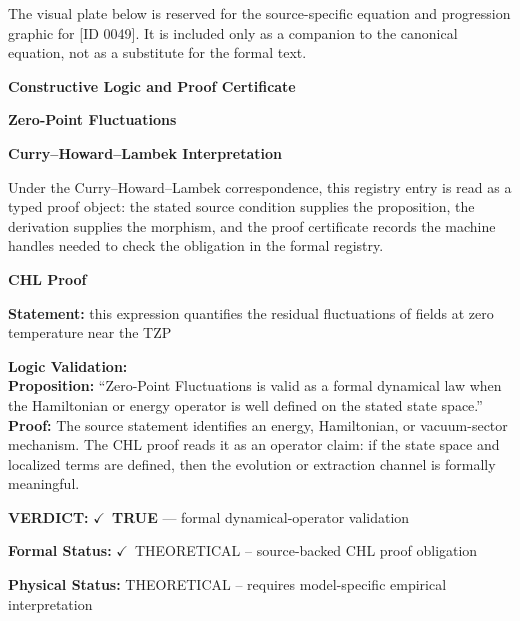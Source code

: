 \begingroup\footnotesize\sloppy
The visual plate below is reserved for the source-specific equation and progression graphic for [ID 0049]. It is included only as a companion to the canonical equation, not as a substitute for the formal text.
\par\endgroup
\ifTZPDarkEdition
{}
\fi

\clearpage
\begingroup\tzpsupportsetup
\noindent\textbf{\fontsize{10.8pt}{12.8pt}\selectfont [ID 0049] Constructive Logic and Proof Certificate}\par
\noindent\textbf{\fontsize{10pt}{12pt}\selectfont Zero-Point Fluctuations}\par
\vspace{0.45em}
\begingroup
\footnotesize
\setlength{\parskip}{0.22em}
\setlength{\parindent}{0pt}
\noindent\textbf{Curry--Howard--Lambek Interpretation}\par
Under the Curry--Howard--Lambek correspondence, this registry entry is read as a typed proof
object: the stated source condition supplies the proposition, the derivation supplies the
morphism, and the proof certificate records the machine handles needed to check the obligation
in the formal registry.

\vspace{0.45em}
\noindent\textbf{CHL Proof}\par
\textbf{Statement:} this expression quantifies the residual fluctuations of fields at zero temperature near
the TZP

\textbf{Logic Validation:}\\
\textbf{Proposition:} ``Zero-Point Fluctuations is valid as a formal dynamical law when the Hamiltonian or
energy operator is well defined on the stated state space.''\\
\textbf{Proof:} The source statement identifies an energy, Hamiltonian, or vacuum-sector mechanism. The
CHL proof reads it as an operator claim: if the state space and localized terms are
defined, then the evolution or extraction channel is formally meaningful.

\textbf{VERDICT:} \ensuremath{\checkmark}\ \textbf{TRUE} --- formal dynamical-operator validation

\textbf{Formal Status:} \ensuremath{\checkmark}\ THEORETICAL -- source-backed CHL proof obligation

\textbf{Physical Status:} THEORETICAL -- requires model-specific empirical interpretation
\par\vspace{0.45em}
\par
\ifTZPDarkEdition
{}
\fi
\endgroup
\endgroup

